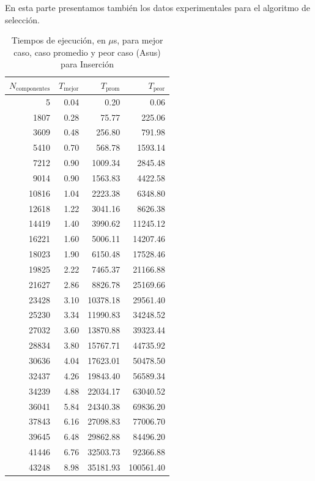 \documentclass{homework}
\begin{document}
    En esta parte presentamos también los datos experimentales para el algoritmo de selección.

    \begin{table}[H] 
        \footnotesize
        \centering 
        \begin{tabular}{|r|r|r|r|} 
                \hline
                $N_{\text{componentes}}$ & $T_{\text{mejor}}$ & $T_{\text{prom}}$ & $T_{\text{peor}}$ \\
                \hline 
                5 & 0.04 & 0.20 & 0.06 \\ 
                1807 & 0.28 & 75.77 & 225.06 \\ 
                3609 & 0.48 & 256.80 & 791.98 \\ 
                5410 & 0.70 & 568.78 & 1593.14 \\ 
                7212 & 0.90 & 1009.34 & 2845.48 \\ 
                9014 & 0.90 & 1563.83 & 4422.58 \\ 
                10816 & 1.04 & 2223.38 & 6348.80 \\ 
                12618 & 1.22 & 3041.16 & 8626.38 \\ 
                14419 & 1.40 & 3990.62 & 11245.12 \\ 
                16221 & 1.60 & 5006.11 & 14207.46 \\ 
                18023 & 1.90 & 6150.48 & 17528.46 \\ 
                19825 & 2.22 & 7465.37 & 21166.88 \\ 
                21627 & 2.86 & 8826.78 & 25169.66 \\ 
                23428 & 3.10 & 10378.18 & 29561.40 \\ 
                25230 & 3.34 & 11990.83 & 34248.52 \\ 
                27032 & 3.60 & 13870.88 & 39323.44 \\ 
                28834 & 3.80 & 15767.71 & 44735.92 \\ 
                30636 & 4.04 & 17623.01 & 50478.50 \\ 
                32437 & 4.26 & 19843.40 & 56589.34 \\ 
                34239 & 4.88 & 22034.17 & 63040.52 \\ 
                36041 & 5.84 & 24340.38 & 69836.20 \\ 
                37843 & 6.16 & 27098.83 & 77006.70 \\ 
                39645 & 6.48 & 29862.88 & 84496.20 \\ 
                41446 & 6.76 & 32503.73 & 92366.88 \\ 
                43248 & 8.98 & 35181.93 & 100561.40 \\ 
                \hline
        \end{tabular}
        \caption{Tiempos de ejecución, en $\mu$s, para mejor caso, caso promedio y peor caso (Asus) para Inserción}
    \end{table}
\end{document}
